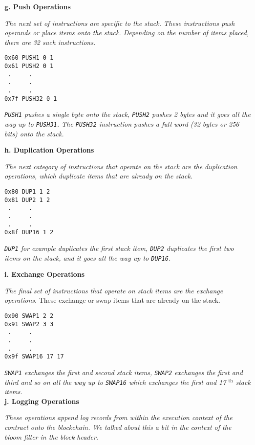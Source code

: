 \hfill\break
\textbf{g. Push Operations}

\emph{The next set of instructions are specific to the stack. These
instructions push operands or place items onto the stack. Depending on
the number of items placed, there are 32 such instructions.}

\begin{lstlisting}[language=Solidity,numbers=none]
0x60 PUSH1 0 1
0x61 PUSH2 0 1
 .     .
 .     .
 .     .
0x7f PUSH32 0 1
\end{lstlisting}

\emph{\texttt{PUSH1} pushes a single byte onto the stack, \texttt{PUSH2}
pushes 2 bytes and it goes all the way up to \texttt{PUSH31}. The
\texttt{PUSH32} instruction pushes a full word (32 bytes or 256 bits)
onto the stack.}

\hfill\break
\textbf{h. Duplication Operations}

\emph{The next category of instructions that operate on the stack are
the duplication operations, which duplicate items that are already on
the stack.}

\begin{lstlisting}[language=Solidity,numbers=none]
0x80 DUP1 1 2
0x81 DUP2 1 2
 .     .
 .     .
 .     .
0x8f DUP16 1 2
\end{lstlisting}

\emph{\texttt{DUP1} for example duplicates the first stack item,
\texttt{DUP2} duplicates the first two items on the stack, and it goes
all the way up to \texttt{DUP16}.}

\textbf{i. Exchange Operations}

\emph{The final set of instructions that operate on stack items are the
exchange operations}. These exchange or swap items that are already on
the stack.

\begin{lstlisting}[language=Solidity,numbers=none]
0x90 SWAP1 2 2
0x91 SWAP2 3 3
 .     .
 .     .
 .     .
0x9f SWAP16 17 17
\end{lstlisting}

\emph{\texttt{SWAP1} exchanges the first and second stack items,
\texttt{SWAP2} exchanges the first and third and so on all the way up to
\texttt{SWAP16} which exchanges the first and 17 \(^\text{th}\) stack
items.}\\

\textbf{j. Logging Operations}

\emph{These operations append log records from within the execution
context of the contract onto the blockchain. We talked about this a bit
in the context of the bloom filter in the block header.}


